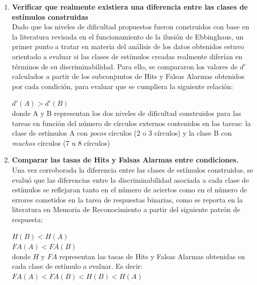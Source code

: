\begin{enumerate}
\item \textbf{Verificar que realmente existiera una diferencia entre las clases de estímulos construidas}\\

Dado que los niveles de dificultad propuestos fueron construidos con base en la literatura revisada en el funcionamiento de la ilusión de Ebbinghaus, un primer punto a tratar en materia del análisis de los datos obtenidos estuvo orientado a evaluar si las clases de estímulos creadas realmente diferían en términos de su discriminabilidad. Para ello, se compararon los valores de $d'$ calculados a partir de los subconjuntos de Hits y Falsas Alarmas obtenidos por cada condición, para evaluar que se cumpliera la siguiente relación:\\

\begin{center}
 $d'(A) > d'(B)$\\
 donde A y B representan los dos niveles de dificultad construidos para las tareas en función del número de círculos externos contenidos en las tareas: la clase de estímulos A con \textit{pocos} círculos (2 o 3 círculos) y la clase B con \textit{muchos} círculos (7 u 8 círculos)\\
\end{center}

\item \textbf{Comparar las tasas de Hits y Falsas Alarmas entre condiciones.}\\

Una vez corroborada la diferencia entre las clases de estímulos construidas, se evaluó que las diferencias entre la discriminabilidad asociada a cada clase de estímulos se reflejaran tanto en el número de aciertos como en el número de errores cometidos en la tarea de respuestas binarias, como se reporta en la literatura en Memoria de Reconocimiento a partir del siguiente patrón de respuesta:\\

\begin{center}
$H(B) < H(A)$\\
$FA(A) < FA(B)$\\
donde $H$ y $FA$ representan las tasas de Hits y Falsas Alarmas obtenidas en cada clase de estímulo a evaluar. Es decir:\\
$FA(A) < FA(B) < H(B) < H(A)$\\
\end{center}


\end{enumerate}
